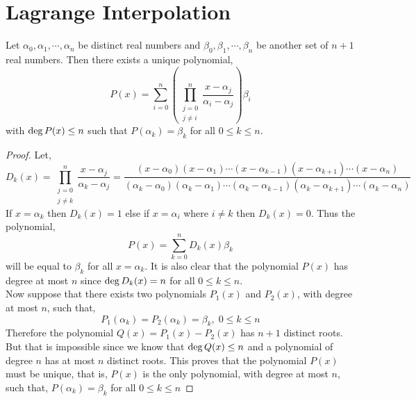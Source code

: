 \section{Lagrange Interpolation}

\begin{theorem}\label{thm:lagrange-interpol}
    Let $\alpha_{0}, \alpha_{1},\cdots , \alpha_{n}$ be distinct real numbers and 
    $\beta_{0}, \beta_{1}, \cdots, \beta_{n}$ be another set of $n+1$ real numbers. 
    Then there exists a unique polynomial,
    \[
    P(x) = \sum_{i=0}^{n} \left( \prod_{\substack{j=0\\ j\neq i}}^{n} \frac{x - \alpha_{j}}{\alpha_{i} - \alpha_{j}} \right) \beta_{i}
    \]
    with $\operatorname{deg} P(x) \leq n$ such that $P(\alpha_{k}) = \beta_{k}$ for all $0\leq k \leq n$.
\end{theorem}
\begin{proof}
    Let,
    \[
    D_{k}(x) = \prod_{\substack{j=0 \\ j\neq k}}^{n} \frac{x - \alpha_{j}}{\alpha_{k} - \alpha_{j}} = 
    \frac{(x-\alpha_{0})(x-\alpha_{1})\cdots (x - \alpha_{k-1})(x - \alpha_{k+1}) \cdots (x - \alpha_{n})}
         {(\alpha_{k}-\alpha_{0})(\alpha_{k}-\alpha_{1})\cdots (\alpha_{k} - \alpha_{k-1})(\alpha_{k} - \alpha_{k+1}) \cdots (\alpha_{k} - \alpha_{n})}
    \]
    If $x=\alpha_k$ then $D_k(x) = 1$ else if $x=\alpha_i$ where 
    $i \neq k$ then $D_k(x)=0$. Thus the polynomial,
    \[ P(x) = \sum_{k=0}^n D_k(x) \beta_k \]
    will be equal to $\beta_k$ for all $x=\alpha_k$. It is also clear that the 
    polynomial $P(x)$ has degree at most $n$ since $\operatorname{deg} D_k(x)=n$ for all 
    $0 \leq k \leq n$. \\
    Now suppose that there exists two polynomials $P_1(x)$ and $P_2(x)$, with degree at 
    most $n$, such that,
    \[ P_1(\alpha_k) = P_2(\alpha_k) = \beta_k, \; 0\leq k \leq n\]
    Therefore the polynomial $Q(x) = P_1(x) - P_2(x)$ has $n+1$ distinct roots. 
    But that is impossible since we know that $\operatorname{deg} Q(x) \leq n$ and 
    a polynomial of degree $n$ has at most $n$ distinct roots. This proves that 
    the polynomial $P(x)$ must be unique, that is, $P(x)$ is the only polynomial, with 
    degree at most $n$, such that, 
    $P(\alpha_k) = \beta_k$ for all $0 \leq k \leq n$
\end{proof}

